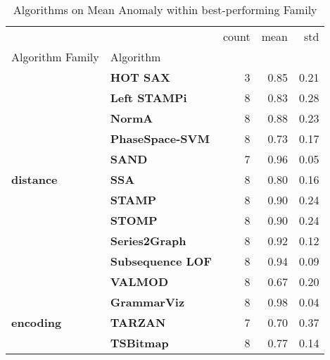 \begin{table}[h]
\centering
\caption{Algorithms on Mean Anomaly within best-performing Family}
\label{tab:bp-mean}
\begin{tabular}{llrrr}
\toprule
 &  & count & mean & std \\
Algorithm Family & Algorithm &  &  &  \\
\midrule
\multirow[t]{11}{*}{\textbf{distance}} & \textbf{HOT SAX} & 3 & 0.85 & 0.21 \\
\textbf{} & \textbf{Left STAMPi} & 8 & 0.83 & 0.28 \\
\textbf{} & \textbf{NormA} & 8 & 0.88 & 0.23 \\
\textbf{} & \textbf{PhaseSpace-SVM} & 8 & 0.73 & 0.17 \\
\textbf{} & \textbf{SAND} & 7 & 0.96 & 0.05 \\
\textbf{} & \textbf{SSA} & 8 & 0.80 & 0.16 \\
\textbf{} & \textbf{STAMP} & 8 & 0.90 & 0.24 \\
\textbf{} & \textbf{STOMP} & 8 & 0.90 & 0.24 \\
\textbf{} & \textbf{Series2Graph} & 8 & 0.92 & 0.12 \\
\textbf{} & \textbf{Subsequence LOF} & 8 & 0.94 & 0.09 \\
\textbf{} & \textbf{VALMOD} & 8 & 0.67 & 0.20 \\
\cline{1-5}
\multirow[t]{3}{*}{\textbf{encoding}} & \textbf{GrammarViz} & 8 & 0.98 & 0.04 \\
\textbf{} & \textbf{TARZAN} & 7 & 0.70 & 0.37 \\
\textbf{} & \textbf{TSBitmap} & 8 & 0.77 & 0.14 \\
\cline{1-5}
\bottomrule
\end{tabular}
\end{table}
